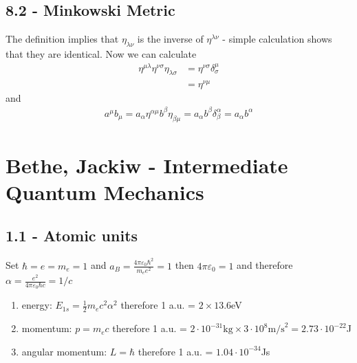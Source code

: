 \documentclass[../main.tex]{subfiles}
\begin{document}
\subsection{8.2 - Minkowski Metric}
The definition implies that $\eta_{\lambda\nu}$ is the inverse of $\eta^{\lambda\nu}$ - simple calculation shows that they are identical. Now we can calculate
\begin{align}
\eta^{\mu\lambda}\eta^{\nu\sigma}\eta_{\lambda\sigma}
&=\eta^{\nu\sigma}\delta^\mu_\sigma\\
&=\eta^{\nu\mu}
\end{align}
and
\begin{align}
a^\mu b_\mu=a_\alpha\eta^{\alpha\mu}b^\beta\eta_{\beta\mu}=a_\alpha b^\beta\delta^\alpha_\beta=a_\alpha b^\alpha
\end{align}


\section{{\sc Bethe, Jackiw} - Intermediate Quantum Mechanics}
\subsection{1.1 - Atomic units}
Set $\hbar=e=m_e=1$ and $a_B=\frac{4\pi\varepsilon_0\hbar^2}{m_ee^2}=1$ then $4\pi\varepsilon_0=1$ and therefore $\alpha=\frac{e^2}{4\pi\varepsilon_0\hbar c}=1/c$
\begin{enumerate}
\item energy: $E_{1s}=\frac{1}{2}m_ec^2\alpha^2$ therefore 1 a.u. = $2\times13.6$eV
\item momentum: $p=m_e c$ therefore 1 a.u. = $2\cdot 10^{-31}\text{kg}\times 3\cdot 10^8\text{m/s}^2=2.73\cdot10^{-22}$J
\item angular momentum: $L=\hbar$ therefore 1 a.u. = $1.04\cdot10^{-34}$Js 
\end{enumerate}
\end{document}
